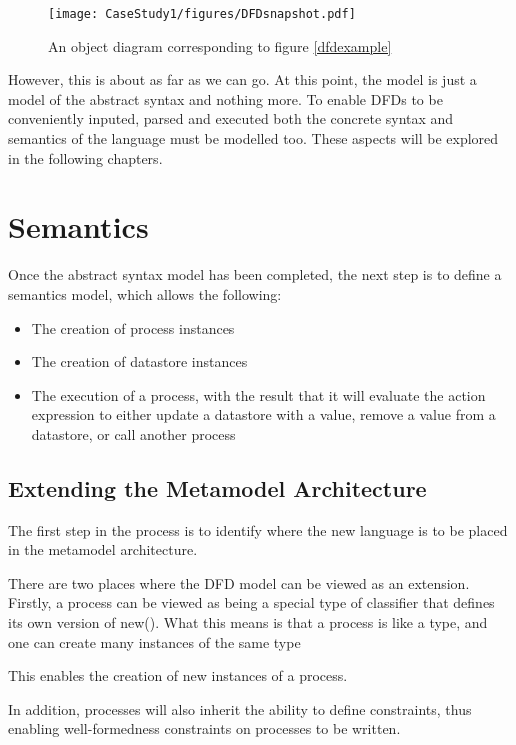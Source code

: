 \begin{figure}[htb]
\begin{center}
\texttt{[image: CaseStudy1/figures/DFDsnapshot.pdf]}
\caption{An object diagram corresponding to figure
\ref{dfdexample}} \label{dfdsnapshot}
\end{center}
\end{figure}

However, this is about as far as we can go. At this point, the
model is just a model of the abstract syntax and nothing more. To
enable DFDs to be conveniently inputed, parsed and executed both
the concrete syntax and semantics of the language must be modelled
too. These aspects will be explored in the following chapters.

\section{Semantics}

Once the abstract syntax model has been completed, the next step is
to define a semantics model, which allows the following:

\begin{itemize}
\item The creation of process instances
\item The creation of datastore instances
\item The execution of a process, with the result that it will evaluate
the action expression to either update a datastore with a value,
remove a value from a datastore, or call another process
\end{itemize}

\subsection{Extending the Metamodel Architecture}

The first step in the process is to identify where the new language
is to  be placed in the metamodel architecture.

There are two places where the DFD model can be viewed as an
extension.  Firstly, a process can be viewed as being a special
type of classifier that defines its own version of new(). What this
means is that a process is like a type, and one can create many
instances of the same type

This enables the creation of new instances of a process.

In addition, processes will also inherit the ability to define
constraints, thus enabling well-formedness constraints on processes
to be written.

